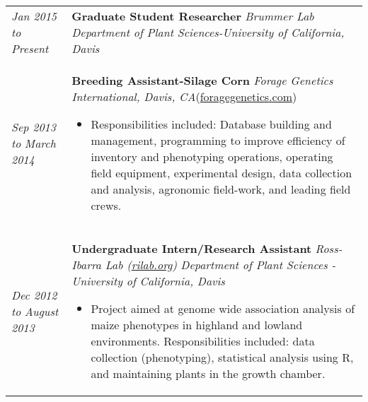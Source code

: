 \documentclass[a4paper]{article}
\begin{document}
\begin{tabular}{p{3cm} p{14cm}}

\vspace{0pt} 
\textit{Jan 2015}\newline
\textit{to}\newline
\textit{Present}\newline
& 
\vspace{0pt}
\textbf{Graduate Student Researcher}\newline
\textit{Brummer Lab}\newline
\textit{Department of Plant Sciences-University of California, Davis}
%
\\
%
\vspace{0pt} 
\textit{Sep 2013}\newline
\textit{to}\newline
\textit{March 2014}\newline
& 
\vspace{0pt}
\textbf{Breeding Assistant-Silage Corn}\newline
\textit{Forage Genetics International, Davis, CA}(\href{http://www.foragegenetics.com/}{foragegenetics.com})
\begin{itemize}[noitemsep,topsep=0pt]
  \item Responsibilities included: Database building and management, programming to improve efficiency of inventory and phenotyping operations, operating field equipment, experimental design, data collection and analysis, agronomic field-work, and leading field crews.
\end{itemize}
%
\\
%
\vspace{0pt} 
\textit{Dec 2012}\newline
\textit{to}\newline
\textit{August 2013}\newline
& 
\vspace{0pt}
\textbf{Undergraduate Intern/Research Assistant}\newline
\textit{Ross-Ibarra Lab (\href{http://www.rilab.org/}{rilab.org})}\newline
\textit{Department of Plant Sciences - University of California, Davis}
\begin{itemize}[noitemsep,topsep=0pt]
  \item Project aimed at genome wide association analysis of maize phenotypes in highland and lowland environments. Responsibilities included: data collection (phenotyping), statistical analysis using R, and maintaining plants in the growth chamber.

\end{itemize}
\end{tabular}
\end{document}
